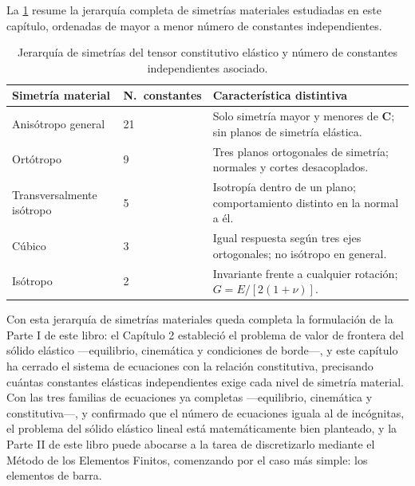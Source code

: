 La \cref{tab:cap03-jerarquia} resume la jerarquía completa de simetrías materiales estudiadas en este capítulo, ordenadas de mayor a menor número de constantes independientes.

\begin{table}[htbp]
\centering
\caption{Jerarquía de simetrías del tensor constitutivo elástico y número de constantes independientes asociado.}
\label{tab:cap03-jerarquia}
\begin{tabular}{@{}p{3.6cm}p{1.6cm}p{7.7cm}@{}}
\toprule
\textbf{Simetría material} & \textbf{N.\ constantes} & \textbf{Característica distintiva} \\
\midrule
Anisótropo general & 21 & Solo simetría mayor y menores de $\bm C$; sin planos de simetría elástica. \\
Ortótropo & 9 & Tres planos ortogonales de simetría; normales y cortes desacoplados. \\
Transversalmente isótropo & 5 & Isotropía dentro de un plano; comportamiento distinto en la normal a él. \\
Cúbico & 3 & Igual respuesta según tres ejes ortogonales; no isótropo en general. \\
Isótropo & 2 & Invariante frente a cualquier rotación; $G=E/[2(1+\nu)]$. \\
\bottomrule
\end{tabular}
\end{table}

Con esta jerarquía de simetrías materiales queda completa la formulación de la Parte I de este libro: el Capítulo 2 estableció el problema de valor de frontera del sólido elástico —equilibrio, cinemática y condiciones de borde—, y este capítulo ha cerrado el sistema de ecuaciones con la relación constitutiva, precisando cuántas constantes elásticas independientes exige cada nivel de simetría material. Con las tres familias de ecuaciones ya completas —equilibrio, cinemática y constitutiva—, y confirmado que el número de ecuaciones iguala al de incógnitas, el problema del sólido elástico lineal está matemáticamente bien planteado, y la Parte II de este libro puede abocarse a la tarea de discretizarlo mediante el Método de los Elementos Finitos, comenzando por el caso más simple: los elementos de barra.
